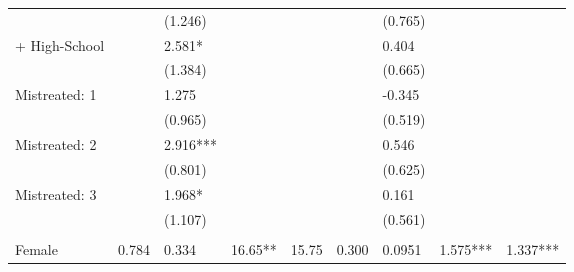 \begin{tabular}{lrrrrrrrr}
      & \multicolumn{1}{l}{} & \multicolumn{1}{l}{(1.246)} & \multicolumn{1}{l}{} & \multicolumn{1}{l}{} & \multicolumn{1}{l}{} & \multicolumn{1}{l}{(0.765)} & \multicolumn{1}{l}{} & \multicolumn{1}{l}{} \\
+ High-School & \multicolumn{1}{l}{} & \multicolumn{1}{l}{2.581*} & \multicolumn{1}{l}{} & \multicolumn{1}{l}{} & \multicolumn{1}{l}{} & \multicolumn{1}{l}{0.404} & \multicolumn{1}{l}{} & \multicolumn{1}{l}{} \\
      & \multicolumn{1}{l}{} & \multicolumn{1}{l}{(1.384)} & \multicolumn{1}{l}{} & \multicolumn{1}{l}{} & \multicolumn{1}{l}{} & \multicolumn{1}{l}{(0.665)} & \multicolumn{1}{l}{} & \multicolumn{1}{l}{} \\
Mistreated: 1 & \multicolumn{1}{l}{} & \multicolumn{1}{l}{1.275} & \multicolumn{1}{l}{} & \multicolumn{1}{l}{} & \multicolumn{1}{l}{} & \multicolumn{1}{l}{-0.345} & \multicolumn{1}{l}{} & \multicolumn{1}{l}{} \\
      & \multicolumn{1}{l}{} & \multicolumn{1}{l}{(0.965)} & \multicolumn{1}{l}{} & \multicolumn{1}{l}{} & \multicolumn{1}{l}{} & \multicolumn{1}{l}{(0.519)} & \multicolumn{1}{l}{} & \multicolumn{1}{l}{} \\
Mistreated: 2 & \multicolumn{1}{l}{} & \multicolumn{1}{l}{2.916***} & \multicolumn{1}{l}{} & \multicolumn{1}{l}{} & \multicolumn{1}{l}{} & \multicolumn{1}{l}{0.546} & \multicolumn{1}{l}{} & \multicolumn{1}{l}{} \\
      & \multicolumn{1}{l}{} & \multicolumn{1}{l}{(0.801)} & \multicolumn{1}{l}{} & \multicolumn{1}{l}{} & \multicolumn{1}{l}{} & \multicolumn{1}{l}{(0.625)} & \multicolumn{1}{l}{} & \multicolumn{1}{l}{} \\
Mistreated: 3 & \multicolumn{1}{l}{} & \multicolumn{1}{l}{1.968*} & \multicolumn{1}{l}{} & \multicolumn{1}{l}{} & \multicolumn{1}{l}{} & \multicolumn{1}{l}{0.161} & \multicolumn{1}{l}{} & \multicolumn{1}{l}{} \\
      & \multicolumn{1}{l}{} & \multicolumn{1}{l}{(1.107)} & \multicolumn{1}{l}{} & \multicolumn{1}{l}{} & \multicolumn{1}{l}{} & \multicolumn{1}{l}{(0.561)} & \multicolumn{1}{l}{} & \multicolumn{1}{l}{} \\
      & \multicolumn{1}{l}{} & \multicolumn{1}{l}{} & \multicolumn{1}{l}{} & \multicolumn{1}{l}{} & \multicolumn{1}{l}{} & \multicolumn{1}{l}{} & \multicolumn{1}{l}{} & \multicolumn{1}{l}{} \\
Female & \multicolumn{1}{l}{0.784} & \multicolumn{1}{l}{0.334} & \multicolumn{1}{l}{16.65**} & \multicolumn{1}{l}{15.75} & \multicolumn{1}{l}{0.300} & \multicolumn{1}{l}{0.0951} & \multicolumn{1}{l}{1.575***} & \multicolumn{1}{l}{1.337***} \\

\end{tabular}
